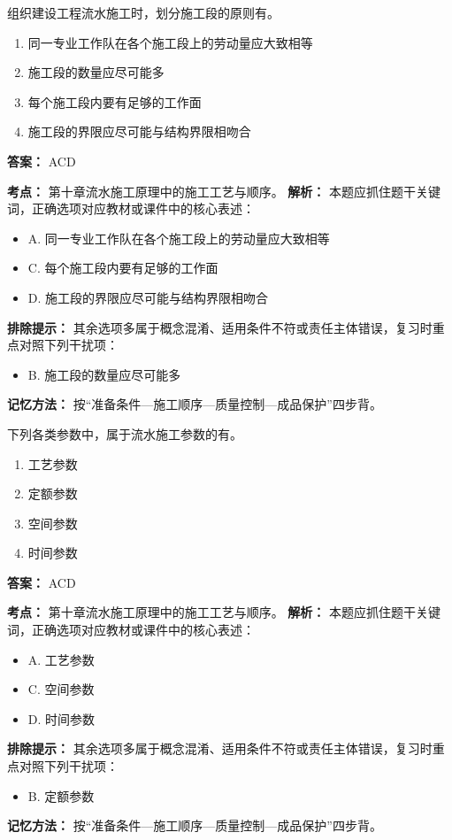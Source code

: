 \documentclass[UTF8,fontset=fandol,11pt]{ctexart}
\begin{document}
\begin{quizbox}[title={第 21 题}]
组织建设工程流水施工时，划分施工段的原则有。\\
\begin{enumerate}[label=\Alph*.]
\item 同一专业工作队在各个施工段上的劳动量应大致相等
\item 施工段的数量应尽可能多
\item 每个施工段内要有足够的工作面
\item 施工段的界限应尽可能与结构界限相吻合
\end{enumerate}
\textbf{答案：} ACD
\vspace{0.25em}
\begin{answerbox}[title={考点解析}]
\textbf{考点：} 第十章流水施工原理中的施工工艺与顺序。
\textbf{解析：} 本题应抓住题干关键词，正确选项对应教材或课件中的核心表述：
\begin{itemize}
\item A. 同一专业工作队在各个施工段上的劳动量应大致相等
\item C. 每个施工段内要有足够的工作面
\item D. 施工段的界限应尽可能与结构界限相吻合
\end{itemize}
\textbf{排除提示：} 其余选项多属于概念混淆、适用条件不符或责任主体错误，复习时重点对照下列干扰项：
\begin{itemize}
\item B. 施工段的数量应尽可能多
\end{itemize}
\textbf{记忆方法：} 按“准备条件—施工顺序—质量控制—成品保护”四步背。
\end{answerbox}
\end{quizbox}

\begin{quizbox}[title={第 22 题}]
下列各类参数中，属于流水施工参数的有。\\
\begin{enumerate}[label=\Alph*.]
\item 工艺参数
\item 定额参数
\item 空间参数
\item 时间参数
\end{enumerate}
\textbf{答案：} ACD
\vspace{0.25em}
\begin{answerbox}[title={考点解析}]
\textbf{考点：} 第十章流水施工原理中的施工工艺与顺序。
\textbf{解析：} 本题应抓住题干关键词，正确选项对应教材或课件中的核心表述：
\begin{itemize}
\item A. 工艺参数
\item C. 空间参数
\item D. 时间参数
\end{itemize}
\textbf{排除提示：} 其余选项多属于概念混淆、适用条件不符或责任主体错误，复习时重点对照下列干扰项：
\begin{itemize}
\item B. 定额参数
\end{itemize}
\textbf{记忆方法：} 按“准备条件—施工顺序—质量控制—成品保护”四步背。
\end{answerbox}
\end{quizbox}
\end{document}
